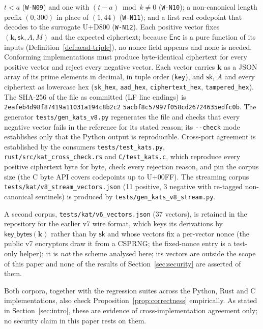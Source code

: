 \documentclass[11pt,a4paper]{article}
\begin{document}
$t < a$ (\texttt{W-N09}) and one with $(t-a) \bmod k \ne 0$
(\texttt{W-N10}); a non-canonical length prefix $(0, 300)$ in place of
$(1, 44)$ (\texttt{W-N11}); and a first real codepoint that decodes to the
surrogate U+D800 (\texttt{W-N12}). Each positive vector
fixes $(\mathbf{k},\mathsf{sk},A,M)$ and the expected
ciphertext; because $\mathsf{Enc}$ is a pure function of its inputs
(Definition~\ref{def:aead-triple}), no nonce field appears and none is
needed. Conforming implementations must produce byte-identical ciphertext
for every positive vector and reject every negative vector. Each vector
carries $\mathbf{k}$ as a JSON array of its prime elements in decimal, in
tuple order (\texttt{key}), and $\mathsf{sk}$, $A$ and every ciphertext as
lowercase hex (\texttt{sk\_hex}, \texttt{aad\_hex}, \texttt{ciphertext\_hex},
\texttt{tampered\_hex}). The SHA-256 of the file as committed (LF line
endings) is \texttt{2eafeb4d98f87419a11031a194c8b2c2}\allowbreak
\texttt{5acbf8c57997f058cd26724635edfc0b}. The generator
\texttt{tests/gen\_kats\_v8.py} regenerates the file and checks that every
negative vector fails in the reference for its stated reason; its
\texttt{-{}-check} mode establishes only that the Python output is
reproducible. Cross-port agreement is established by the consumers
\texttt{tests/test\_kats.py}, \texttt{rust/src/kat\_cross\_check.rs} and
\texttt{C/test\_kats.c}, which reproduce every positive ciphertext byte for
byte, check every rejection reason, and pin the corpus size (the C byte API
covers codepoints up to U+00FF). The streaming corpus
\texttt{tests/kat/v8\_stream\_vectors.json} (11 positive, 3 negative with
re-tagged non-canonical sentinels) is produced by
\texttt{tests/gen\_kats\_v8\_stream.py}.

A second corpus, \texttt{tests/kat/v6\_vectors.json} (37 vectors), is
retained in the repository for the earlier v7 wire format, which keys its
derivations by $\mathsf{key\_bytes}(\mathbf{k})$ rather than by
$\mathsf{sk}$ and whose vectors
fix a per-vector nonce (the public v7 encryptors draw it from a CSPRNG; the
fixed-nonce entry is a test-only helper); it is \emph{not} the scheme analysed here; its
vectors are outside the scope of this paper and none of the results of
Section~\ref{sec:security} are asserted of them.

Both corpora, together with the regression suites across the Python, Rust
and C implementations, also check Proposition~\ref{prop:correctness}
empirically. As stated in Section~\ref{sec:intro}, these are evidence of
cross-implementation agreement only; no security claim in this paper rests
on them.
\end{document}
